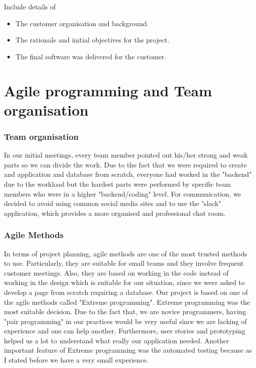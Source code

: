 \documentclass{l3proj}
\begin{document}
Include details of 

\begin{itemize}
\item The customer organisation and background.
\item The rationale and initial objectives for the project.
\item The final software was delivered for the customer.
\end{itemize}

\section{Agile programming and Team organisation}

\subsubsection{Team organisation}
\label{organisation}

In our initial meetings, every team member pointed out his/her strong and weak parts so we can divide the work. Due to the fact that we were required to create and application and database from scratch, everyone had worked in the "backend" due to the workload but the hardest parts were performed by specific team members who were in a higher "backend/coding" level. For communication, we decided to avoid using common social media sites and to use the "slack" application, which provides a more organised and professional chat room. 

\subsubsection{Agile Methods}
\label{agile}

In terms of project planning, agile methods are one of the most trusted methods to use. Particularly, they are suitable for small teams and they involve frequent customer meetings. Also, they are based on working in the code instead of working in the design which is suitable for our situation, since we were asked to develop a page from scratch requiring a database. Our project is based on one of the agile methods called "Extreme programming". Extreme programming was the most suitable decision. Due to the fact that, we are novice programmers, having "pair programming" in our practices would be very useful since we are lacking of experience and one can help another. Furthermore, user stories and prototyping helped us a lot to understand what really our application needed. Another important feature of Extreme programming was the automated testing because as I stated before we have a very small experience.
\end{document}
